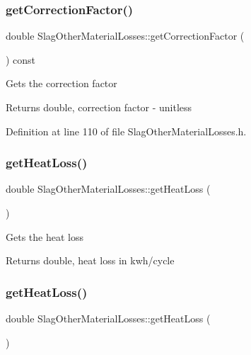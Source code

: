 \subsubsection{\texorpdfstring{get\+Correction\+Factor()}{getCorrectionFactor()}\hspace{0.1cm}{\footnotesize\ttfamily [3/3]}}
{\footnotesize\ttfamily double Slag\+Other\+Material\+Losses\+::get\+Correction\+Factor (\begin{DoxyParamCaption}{ }\end{DoxyParamCaption}) const\hspace{0.3cm}{\ttfamily [inline]}}

Gets the correction factor \begin{DoxyReturn}{Returns}
double, correction factor -\/ unitless 
\end{DoxyReturn}


Definition at line 110 of file Slag\+Other\+Material\+Losses.\+h.

\mbox{\label{class_slag_other_material_losses_a4c96a826ef6da38f4c27f7efd8b4a7ba}} 
\subsubsection{\texorpdfstring{get\+Heat\+Loss()}{getHeatLoss()}\hspace{0.1cm}{\footnotesize\ttfamily [1/3]}}
{\footnotesize\ttfamily double Slag\+Other\+Material\+Losses\+::get\+Heat\+Loss (\begin{DoxyParamCaption}{ }\end{DoxyParamCaption})}

Gets the heat loss \begin{DoxyReturn}{Returns}
double, heat loss in kwh/cycle 
\end{DoxyReturn}
\mbox{\label{class_slag_other_material_losses_a4c96a826ef6da38f4c27f7efd8b4a7ba}} 
\subsubsection{\texorpdfstring{get\+Heat\+Loss()}{getHeatLoss()}\hspace{0.1cm}{\footnotesize\ttfamily [2/3]}}
{\footnotesize\ttfamily double Slag\+Other\+Material\+Losses\+::get\+Heat\+Loss (\begin{DoxyParamCaption}{ }\end{DoxyParamCaption})}

